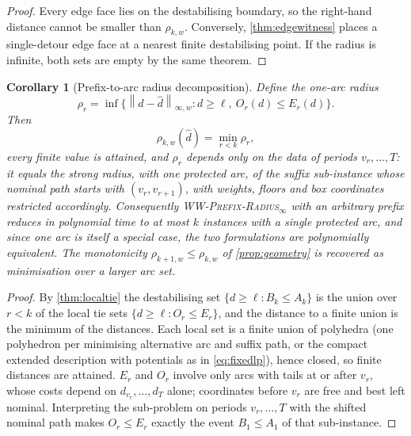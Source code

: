 \documentclass[11pt]{article}
\newtheorem{corollary}[theorem]{Corollary}
\theoremstyle{definition}
\newcommand{\winf}[1]{\left\lVert #1\right\rVert_{\infty,w}}
\newcommand{\WWR}{\textsc{WW-Prefix-Radius}\ensuremath{_{\infty}}}
\newcommand{\dhat}{\widehat d}
\newcommand{\ellv}{\ell}
\begin{document}
\begin{proof}
Every edge face lies on the destabilising boundary, so the right-hand distance cannot be smaller than $\rho_{k,w}$. Conversely, \cref{thm:edgewitness} places a single-detour edge face at a nearest finite destabilising point. If the radius is infinite, both sets are empty by the same theorem.
\end{proof}

\begin{corollary}[Prefix-to-arc radius decomposition]\label{cor:arcreduction}
Define the one-arc radius
\[
\rho_r
=\inf\bigl\{\winf{d-\dhat}:d\ge\ellv,\ O_r(d)\le E_r(d)\bigr\}.
\]
Then
\[
\rho_{k,w}(\dhat)=\min_{r<k}\rho_r,
\]
every finite value is attained, and $\rho_r$ depends only on the data of
periods $v_r,\ldots,T$: it equals the strong radius, with one protected
arc, of the suffix sub-instance whose nominal path starts with
$(v_r,v_{r+1})$, with weights, floors and box coordinates restricted
accordingly. Consequently \WWR{} with an arbitrary prefix reduces in
polynomial time to at most $k$ instances with a single protected arc, and
since one arc is itself a special case, the two formulations are
polynomially equivalent. The monotonicity
$\rho_{k+1,w}\le\rho_{k,w}$ of \cref{prop:geometry} is recovered as
minimisation over a larger arc set.
\end{corollary}

\begin{proof}
By \cref{thm:localtie} the destabilising set
$\{d\ge\ellv:B_k\le A_k\}$ is the union over $r<k$ of the local tie sets
$\{d\ge\ellv:O_r\le E_r\}$, and the distance to a finite union is the
minimum of the distances. Each local set is a finite union of polyhedra
(one polyhedron per minimising alternative arc and suffix path, or the
compact extended description with potentials as in \eqref{eq:fixedlp}),
hence closed, so finite distances are attained. $E_r$ and $O_r$ involve
only arcs with tails at or after $v_r$, whose costs depend on
$d_{v_r},\ldots,d_T$ alone; coordinates before $v_r$ are free and best
left nominal. Interpreting the sub-problem on periods $v_r,\ldots,T$ with
the shifted nominal path makes $O_r\le E_r$ exactly the event
$B_1\le A_1$ of that sub-instance.
\end{proof}
\end{document}
